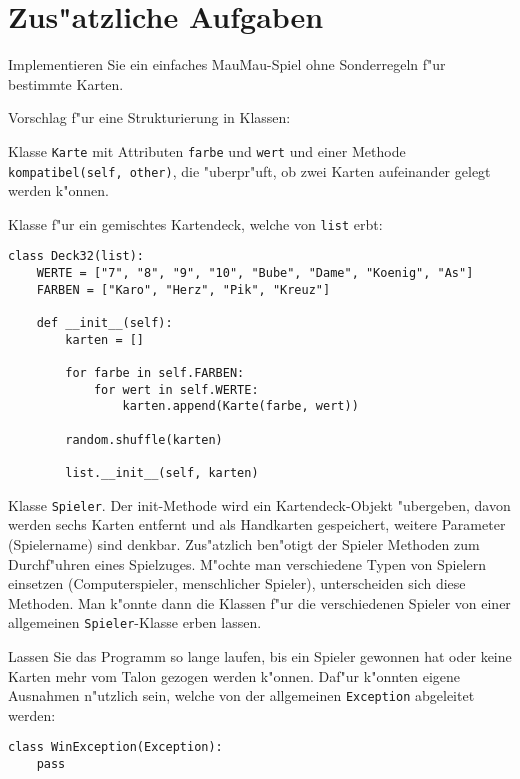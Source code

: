 \section*{Zus"atzliche Aufgaben}

\begin{aufgabe}[MauMau]
Implementieren Sie ein einfaches MauMau-Spiel ohne Sonderregeln f"ur bestimmte Karten. 

\begin{teilaufgabe}[Grundlagen]
Vorschlag f"ur eine Strukturierung in Klassen:
\begin{auflistung}
\item Klasse \lstinline{Karte} mit Attributen \lstinline{farbe} und \lstinline{wert} und einer Methode \lstinline{kompatibel(self, other)}, die "uberpr"uft, ob zwei Karten aufeinander gelegt werden k"onnen.
\item Klasse f"ur ein gemischtes Kartendeck, welche von \lstinline{list} erbt:
\begin{lstlisting}
class Deck32(list):
    WERTE = ["7", "8", "9", "10", "Bube", "Dame", "Koenig", "As"]
    FARBEN = ["Karo", "Herz", "Pik", "Kreuz"]

    def __init__(self):
        karten = []

        for farbe in self.FARBEN:
            for wert in self.WERTE:
                karten.append(Karte(farbe, wert))

        random.shuffle(karten)

        list.__init__(self, karten)
\end{lstlisting}
\item Klasse \lstinline{Spieler}. Der init-Methode wird ein Kartendeck-Objekt "ubergeben, davon werden sechs Karten entfernt und als Handkarten gespeichert, weitere Parameter (Spielername) sind denkbar. Zus"atzlich ben"otigt der Spieler Methoden zum Durchf"uhren eines Spielzuges. M"ochte man verschiedene Typen von Spielern einsetzen (Computerspieler, menschlicher Spieler), unterscheiden sich diese Methoden. Man k"onnte dann die Klassen f"ur die verschiedenen Spieler von einer allgemeinen \lstinline{Spieler}-Klasse erben lassen.
\end{auflistung}
Lassen Sie das Programm so lange laufen, bis ein Spieler gewonnen hat oder keine Karten mehr vom Talon gezogen werden k"onnen. Daf"ur k"onnten eigene Ausnahmen n"utzlich sein, welche von der allgemeinen \lstinline{Exception} abgeleitet werden:
\begin{lstlisting}
class WinException(Exception):
    pass


\end{lstlisting}
\end{teilaufgabe}
\end{aufgabe}
